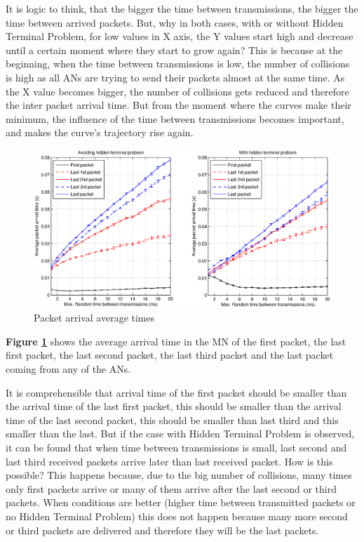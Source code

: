It is logic to think, that the bigger the time between transmissions, the bigger the time between arrived packets. But, why in both cases, with 
or without Hidden Terminal Problem, for low values in X axis, the Y values start high and decrease until a certain moment where they start to 
grow again? This is because at the beginning, when the time between transmissions is low, the number of collisions is high as all \acp{AN} are 
trying to send their packets almost at the same time. As the X value becomes bigger, the number of collisions gets reduced and therefore the inter 
packet arrival time. But from the moment where the curves make their minimum, the influence of the time between transmissions becomes 
important, and makes the curve's trajectory rise again.

\begin{figure}[ht]
 \begin{center}
  \includegraphics[width=1\textwidth]{averageDifferentTimes.eps}
 \end{center}
 \caption{Packet arrival average times}
 \label{fig:averageDifferentTimes}
\end{figure}

\textbf{Figure \ref{fig:averageDifferentTimes}} shows the average arrival time in the \ac{MN} of the first packet, the last first packet, the last
second packet, the last third packet and the last packet coming from any of the \acp{AN}.

It is comprehensible that arrival time of the first packet should be smaller than the arrival time of the last first packet, this should be smaller than
 the arrival time of the last second packet, this should be smaller than last third and this smaller than the last. But if the case with Hidden 
Terminal Problem is observed, it can be found that when time between transmissions is small, last second and last third received packets arrive later 
than last received packet. How is this possible? This happens because, due to the big number of collisions, many times only first packets arrive or many of 
them arrive after the last second or third packets. When conditions are better (higher time between transmitted packets or no Hidden Terminal Problem) 
this does not happen because many more second or third packets are delivered and therefore they will be the last packets.

